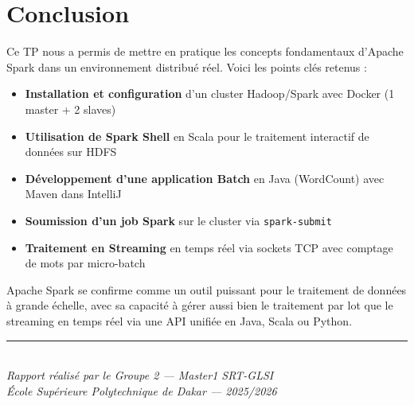 \documentclass[12pt,a4paper]{report}
\begin{document}
\chapter*{Conclusion}

Ce TP nous a permis de mettre en pratique les concepts fondamentaux d'Apache Spark dans un environnement distribué réel. Voici les points clés retenus :

\begin{tcolorbox}[colback=bleuESP!5, colframe=bleuESP, title=\textbf{Bilan du TP}]
\begin{itemize}
  \item[$\checkmark$] \textbf{Installation et configuration} d'un cluster Hadoop/Spark avec Docker (1 master + 2 slaves)
  \item[$\checkmark$] \textbf{Utilisation de Spark Shell} en Scala pour le traitement interactif de données sur HDFS
  \item[$\checkmark$] \textbf{Développement d'une application Batch} en Java (WordCount) avec Maven dans IntelliJ
  \item[$\checkmark$] \textbf{Soumission d'un job Spark} sur le cluster via \texttt{spark-submit}
  \item[$\checkmark$] \textbf{Traitement en Streaming} en temps réel via sockets TCP avec comptage de mots par micro-batch
\end{itemize}
\end{tcolorbox}

\vspace{0.5cm}

Apache Spark se confirme comme un outil puissant pour le traitement de données à grande échelle, avec sa capacité à gérer aussi bien le traitement par lot que le streaming en temps réel via une API unifiée en Java, Scala ou Python.

\vspace{0.5cm}

\begin{center}
{\color{bleuESP}\rule{0.5\textwidth}{0.8pt}}\\
\vspace{0.3cm}
\textit{Rapport réalisé par le Groupe 2 — Master1 SRT-GLSI}\\
\textit{École Supérieure Polytechnique de Dakar — 2025/2026}
\end{center}
\end{document}
